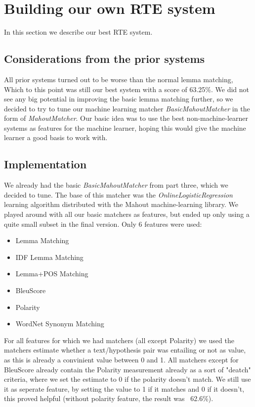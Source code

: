 \section{Building our own RTE system}
In this section we describe our best RTE system.

\subsection{Considerations from the prior systems}
All prior systems turned out to be worse than the normal lemma matching, Which to this point was still our  best system
with a score of 63.25\%. We did not see any big potential in improving the basic lemma matching further, so we decided
to try to tune our machine learning matcher \textit{BasicMahoutMatcher} in the form of \textit{MahoutMatcher}. Our basic
idea was to use the best non-machine-learner systems as features for the machine learner, hoping this would give the
machine learner a good basis to work with.

\subsection{Implementation}
We already had the basic \textit{BasicMahoutMatcher} from part three, which we decided to tune. The base of this matcher
was the \textit{OnlineLogisticRegression} learning algorithm distributed with the Mahout machine-learning library. We
played around with all our basic matchers as features, but ended up only using a quite small subset in the final
version. Only 6 features were used:
\begin{itemize}
    \item Lemma Matching
    \item IDF Lemma Matching
    \item Lemma+POS Matching
    \item BleuScore
    \item Polarity
    \item WordNet Synonym Matching
\end{itemize}

For all features for which we had matchers (all except Polarity) we used the matchers estimate whether a text/hypothesis
pair was entailing or not as value, as this is already a convinient value between 0 and 1. All matchers except for
BleuScore already contain the Polarity measurement already as a sort of "deatch" criteria, where we set the estimate to
0 if the polarity doesn't match. We still use it as seperate feature, by setting the value to 1 if it matches and 0 if
it doesn't, this proved helpful (without polarity feature, the result was ~62.6\%).



